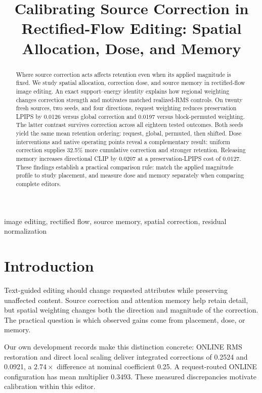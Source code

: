 \documentclass[conference]{IEEEtran}
\title{Calibrating Source Correction in Rectified-Flow Editing: Spatial Allocation, Dose, and Memory}
\author{}
\begin{document}
\raggedbottom
\setcounter{topnumber}{3}
\setcounter{dbltopnumber}{3}
\renewcommand{\topfraction}{0.95}
\renewcommand{\dbltopfraction}{0.95}
\renewcommand{\textfraction}{0.05}
\renewcommand{\floatpagefraction}{0.75}
\renewcommand{\dblfloatpagefraction}{0.75}
\maketitle
\begin{abstract}
Where source correction acts affects retention even when its applied magnitude is fixed. We study spatial allocation, correction dose, and source memory in rectified-flow image editing. An exact support--energy identity explains how regional weighting changes correction strength and motivates matched realized-RMS controls. On twenty fresh sources, two seeds, and four directions, request weighting reduces preservation LPIPS by 0.0126 versus global correction and 0.0197 versus block-permuted weighting. The latter contrast survives correction across all eighteen tested outcomes. Both seeds yield the same mean retention ordering: request, global, permuted, then shifted. Dose interventions and native operating points reveal a complementary result: uniform correction supplies 32.5\% more cumulative correction and stronger retention. Releasing memory increases directional CLIP by 0.0207 at a preservation-LPIPS cost of 0.0127. These findings establish a practical comparison rule: match the applied magnitude profile to study placement, and measure dose and memory separately when comparing complete editors.
\end{abstract}
\begin{IEEEkeywords}
image editing, rectified flow, source memory, spatial correction, residual normalization
\end{IEEEkeywords}

\section{Introduction}
Text-guided editing should change requested attributes while preserving unaffected content. Source correction and attention memory help retain detail, but spatial weighting changes both the direction and magnitude of the correction. The practical question is which observed gains come from placement, dose, or memory.

Our own development records make this distinction concrete: ONLINE RMS restoration and direct local scaling deliver integrated corrections of 0.2524 and 0.0921, a $2.74\times$ difference at nominal coefficient 0.25. A request-routed ONLINE configuration has mean multiplier 0.3493. These measured discrepancies motivate calibration within this editor.
\end{document}
